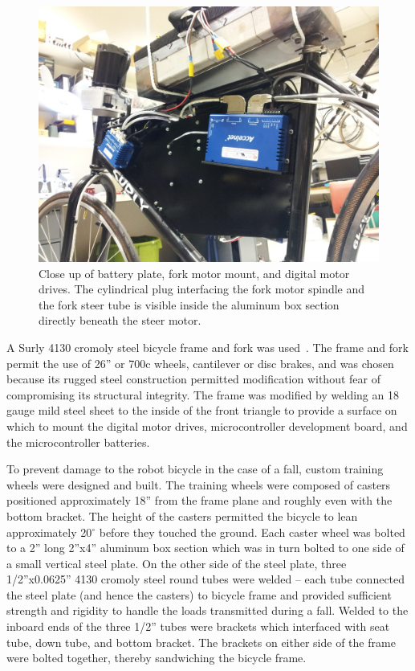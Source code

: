 \begin{figure}[h]
  \centering
  \includegraphics[width=\textwidth]{images/IMG_20120928_153336.jpg}
  \caption{Close up of battery plate, fork motor mount, and digital motor
  drives. The cylindrical plug interfacing the fork motor spindle and the fork
steer tube is visible inside the aluminum box section directly beneath the
steer motor.}
  \label{rb:img:leftsidecloseup}
\end{figure}

A Surly 4130 cromoly steel bicycle frame and fork was used~\cite{Surly2009}.
The frame and fork permit the use of 26'' or 700c wheels, cantilever or disc
brakes, and was chosen because its rugged steel construction permitted
modification without fear of compromising its structural integrity.  The frame
was modified by welding an 18 gauge mild steel sheet to the inside of the front
triangle to provide a surface on which to mount the digital motor drives,
microcontroller development board, and the microcontroller batteries.

To prevent damage to the robot bicycle in the case of a fall, custom training
wheels were designed and built. The training wheels were composed of casters
positioned approximately 18'' from the frame plane and roughly even with the
bottom bracket. The height of the casters permitted the bicycle to lean
approximately 20$^{\circ}$ before they touched the ground. Each caster wheel
was bolted to a 2'' long 2''x4'' aluminum box section which was in turn bolted
to one side of a small vertical steel plate. On the other side of the steel
plate, three 1/2''x0.0625'' 4130 cromoly steel round tubes were welded -- each
tube connected the steel plate (and hence the casters) to bicycle frame and
provided sufficient strength and rigidity to handle the loads transmitted
during a fall. Welded to the inboard ends of the three 1/2'' tubes were
brackets which interfaced with seat tube, down tube, and bottom bracket. The
brackets on either side of the frame were bolted together, thereby sandwiching
the bicycle frame.

